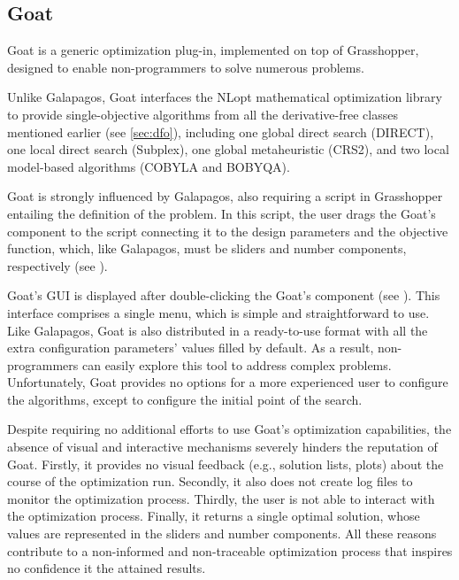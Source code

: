 	\subsection{Goat}
	Goat \cite{GOAT} is a generic optimization plug-in, implemented on top of Grasshopper, designed to enable non-programmers to solve numerous problems.
	
	Unlike Galapagos, Goat interfaces the NLopt mathematical optimization library~\cite{NLOPT} to provide single-objective algorithms from all the derivative-free classes mentioned earlier (see \cref{sec:dfo}), including one global direct search (DIRECT), one local direct search (Subplex), one global metaheuristic (CRS2), and two local model-based algorithms (COBYLA and BOBYQA). 
	
	Goat is strongly influenced by Galapagos, also requiring a script in Grasshopper entailing the definition of the problem. In this script, the user drags the Goat's component to the script connecting it to the design parameters and the objective function, which, like Galapagos, must be sliders and number components, respectively (see ).
	
	Goat's \ac{GUI} is displayed after double-clicking the Goat's component (see ). This interface comprises a single menu, which is simple and straightforward to use. Like Galapagos, Goat is also distributed in a ready-to-use format with all the extra configuration parameters' values filled by default. As a result, non-programmers can easily explore this tool to address complex problems. Unfortunately, Goat provides no options for a more experienced user to configure the algorithms, except to configure the initial point of the search.
	
	Despite requiring no additional efforts to use Goat's optimization capabilities, the absence of visual and interactive mechanisms severely hinders the reputation of Goat. Firstly, it provides no visual feedback (e.g., solution lists, plots) about the course of the optimization run. Secondly, it also does not create log files to monitor the optimization process. Thirdly, the user is not able to interact with the optimization process. Finally, it returns a single optimal solution, whose values are represented in the sliders and number components. All these reasons contribute to a non-informed and non-traceable optimization process that inspires no confidence it the attained results. 
	
